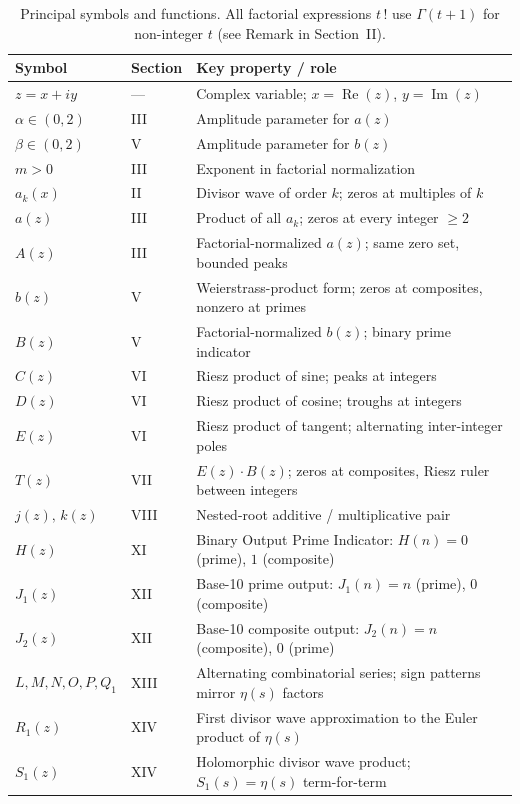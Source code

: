 \documentclass{article}
\begin{document}
\begin{table}[h!]
\centering
\begin{tabular}{@{}lll@{}}
\toprule
Symbol & Section & Key property / role \\
\midrule
$z = x + iy$ & — & Complex variable; $x = \operatorname{Re}(z)$, $y = \operatorname{Im}(z)$ \\
$\alpha \in (0,2)$ & III & Amplitude parameter for $a(z)$ \\
$\beta \in (0,2)$ & V & Amplitude parameter for $b(z)$ \\
$m > 0$ & III & Exponent in factorial normalization \\
\midrule
$a_k(x)$ & II & Divisor wave of order $k$; zeros at multiples of $k$ \\
$a(z)$ & III & Product of all $a_k$; zeros at every integer $\geq 2$ \\
$A(z)$ & III & Factorial-normalized $a(z)$; same zero set, bounded peaks \\
$b(z)$ & V & Weierstrass-product form; zeros at composites, nonzero at primes \\
$B(z)$ & V & Factorial-normalized $b(z)$; binary prime indicator \\
$C(z)$ & VI & Riesz product of sine; peaks at integers \\
$D(z)$ & VI & Riesz product of cosine; troughs at integers \\
$E(z)$ & VI & Riesz product of tangent; alternating inter-integer poles \\
$T(z)$ & VII & $E(z) \cdot B(z)$; zeros at composites, Riesz ruler between integers \\
$j(z),\, k(z)$ & VIII & Nested-root additive / multiplicative pair \\
$H(z)$ & XI & Binary Output Prime Indicator: $H(n) = 0$ (prime), $1$ (composite) \\
$J_1(z)$ & XII & Base-10 prime output: $J_1(n) = n$ (prime), $0$ (composite) \\
$J_2(z)$ & XII & Base-10 composite output: $J_2(n) = n$ (composite), $0$ (prime) \\
$L,M,N,O,P,Q_1$ & XIII & Alternating combinatorial series; sign patterns mirror $\eta(s)$ factors \\
$R_1(z)$ & XIV & First divisor wave approximation to the Euler product of $\eta(s)$ \\
$S_1(z)$ & XIV & Holomorphic divisor wave product; $S_1(s) = \eta(s)$ term-for-term \\
\bottomrule
\end{tabular}
\caption{Principal symbols and functions. All factorial expressions $t\,!$ use $\Gamma(t+1)$ for non-integer $t$ (see Remark in Section~II).}
\label{tab:notation}
\end{table}
\end{document}
